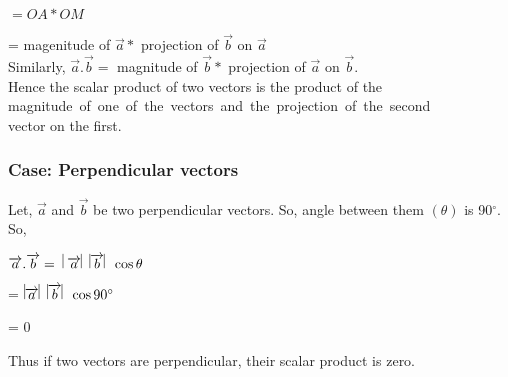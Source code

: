 \documentclass[11pt]{article}
\begin{document}
\hspace{0.9cm}
$=OA*OM$


\hspace{0.9cm}
= magenitude of $\overrightarrow{a}*$ projection of $\overrightarrow{b}$ on $\overrightarrow{a}$ \\
Similarly, $\overrightarrow{a}.\overrightarrow{b}=$ magnitude of $\overrightarrow{b}*$ projection of $\overrightarrow{a}$ on $\overrightarrow{b}$.\\
Hence the scalar product of two vectors is the product of the\\
\mbox{magnitude of one of the vectors and the projection of the second}\\ vector on the first.\\
\subsubsection{Case: Perpendicular vectors}
Let, $\overrightarrow{a}$ and $\overrightarrow{b}$ be two perpendicular vectors. So, angle between them $(\theta)$ is 90$^{\circ}$.\\
So, \begin{center} $\overrightarrow{a}.\overrightarrow{b} =\hspace{0.2cm} \vline \overrightarrow{a} \vline \hspace{0.2cm} \vline \overrightarrow{b} \vline \hspace{0.2cm} \cos \theta$


\hspace{1.2cm}
= $\vline \overrightarrow{a} \vline \hspace{0.2cm} \vline \overrightarrow{b} \vline \hspace{0.2cm} \cos 90^{\circ}$


\hspace{-1cm}
= $0$
\end{center}
Thus if two vectors are perpendicular, their scalar product is zero.\\\\
\end{document}
